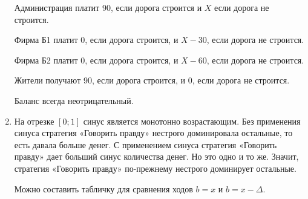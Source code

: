 \begin{enumerate}
Администрация платит 90, если дорога строится и $ X $ если дорога не строится.

Фирма Б1 платит 0, если дорога строится, и $ X-30 $, если дорога не строится.

Фирма Б2 платит 0, если дорога строится, и $ X-60 $, если дорога не строится.

Жители получают 90, если дорога строится, и 0, если дорога не строится.

Баланс всегда неотрицательный.


\item На отрезке $ [0;1] $ синус является монотонно возрастающим. Без применения синуса стратегия «Говорить правду» нестрого доминировала остальные, то есть давала больше денег. С применением синуса стратегия «Говорить правду» дает больший синус количества денег. Но это одно и то же. Значит, стратегия «Говорить правду» по-прежнему нестрого доминирует остальные.

Можно составить табличку для сравнения ходов $ b=x $ и $ b=x-\Delta $.


\end{enumerate}
